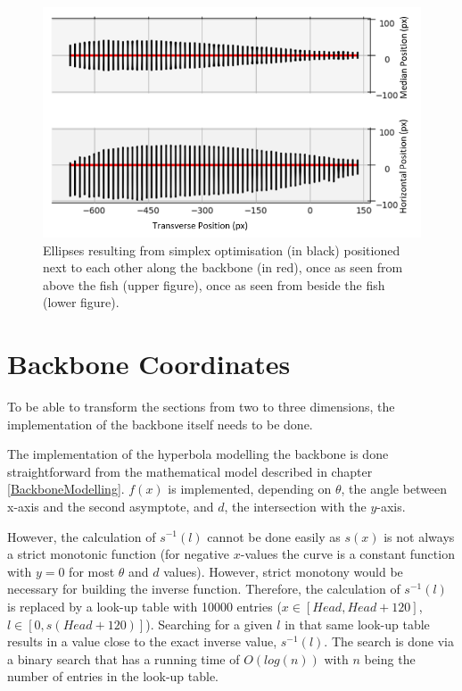 \begin{figure}
    \centering
    \includegraphics[width = 1\linewidth]{figures/Ellipses.PNG}
    \caption{Ellipses resulting from simplex optimisation (in black) positioned next to each other along the backbone (in red), once as seen from above the fish (upper figure), once as seen from beside the fish (lower figure).}
    \label{fig:ellipses}
\end{figure}


\section{Backbone Coordinates}
    \label{Backbonecoordinates}

To be able to transform the sections from two to three dimensions, the implementation of the backbone itself needs to be done. 

The implementation of the hyperbola modelling the backbone is done straightforward from the mathematical model described in chapter \ref{BackboneModelling}. $f(x)$ is implemented, depending on $\theta$, the angle between x-axis and the second asymptote, and $d$, the intersection with the $y$-axis. 

However, the calculation of $s^{-1}(l)$ cannot be done easily as $s(x)$ is not always a strict monotonic function (for negative $x$-values the curve is a constant function with $y=0$ for most $\theta$ and $d$ values). However, strict monotony would be necessary for building the inverse function. Therefore, the calculation of $s^{-1}(l)$ is replaced by a look-up table with 10000 entries ($x \in [Head, Head + 120]$, $l \in [0, s(Head+120)]$). Searching for a given $l$ in that same look-up table results in a value close to the exact inverse value, $s^{-1}(l)$. The search is done via a binary search that has a running time of $O(log(n))$ with $n$ being the number of entries in the look-up table. 

